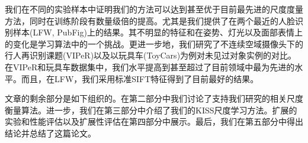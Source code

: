 我们在不同的实验样本中证明我们的方法可以达到甚至优于目前最先进的尺度度量方法，同时在训练阶段有数量级倍的提高。尤其是我们提供了在两个最近的人脸识别样本(LFW\cite{lowe2004distinctive}, PubFig\cite{nowak2007learning})上的结果。其不明显的特征和在姿势、灯光以及面部表情上的变化是学习算法中的一个挑战。更进一步地，我们研究了不连续空域摄像头下的行人再识别课题(VIPeR\cite{gray2007evaluating})以及以玩具车(ToyCars\cite{nowak2007learning})为例对未见过对象实例的对比。在VIPeR和玩具车数据集中，我们水平提高到甚至超过了目前领域中最为先进的水平。而且，在LFW，我们采用标准SIFT特征得到了目前最好的结果。

文章的剩余部分是如下组织的。在第二部分中我们讨论了支持我们研究的相关尺度衡量算法。进一步，我们在第三部分中介绍了我们的KISS尺度学习方法。扩展的实验和性能评估以及扩展性评估在第四部分中展示。最后，我们在第五部分中得出结论并总结了这篇论文。

